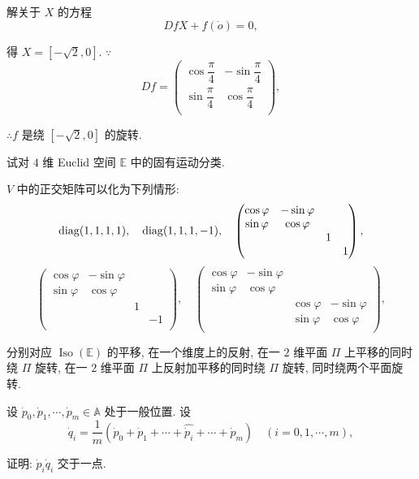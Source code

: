 \documentclass[color=black,device=normal,lang=cn,mode=geye]{elegantnote}
\begin{document}
\begin{solution}
    解关于 $X$ 的方程
    \[DfX+f(\dot{o})=0,\]

    得 $X=[-\sqrt{2},0]$. $\because$
    \[Df=\begin{pmatrix}
        \cos\dfrac{\pi}{4} & -\sin\dfrac{\pi}{4} \\[8pt]
        \sin\dfrac{\pi}{4} & \cos\dfrac{\pi}{4} \\
    \end{pmatrix},\]

    $\therefore f$ 是绕 $[-\sqrt{2},0]$ 的旋转.
\end{solution}
\begin{exercise}%
    试对 $4$ 维 Euclid 空间 $\mathbb{E}$ 中的固有运动分类.
\end{exercise}
\begin{solution}
    $V$ 中的正交矩阵可以化为下列情形:
    \[\operatorname{diag} (1,1,1,1),\quad\operatorname{diag} (1,1,1,-1),\quad\begin{pmatrix}
        \cos\varphi & -\sin\varphi \\
        \sin\varphi & \cos\varphi \\
        && 1 \\
        &&& 1 \\
    \end{pmatrix},\]
    \[\begin{pmatrix}
        \cos\varphi & -\sin\varphi \\
        \sin\varphi & \cos\varphi \\
        && 1 \\
        &&& -1 \\
    \end{pmatrix},\quad\begin{pmatrix}
        \cos\varphi & -\sin\varphi \\
        \sin\varphi & \cos\varphi \\
        && \cos\varphi & -\sin\varphi \\
        && \sin\varphi & \cos\varphi \\
    \end{pmatrix},\]

    分别对应 $\operatorname{Iso}(\mathbb{E})$ 的平移, 在一个维度上的反射, 在一 $2$ 维平面 $\varPi$ 上平移的同时绕 $\varPi$ 旋转, 在一 $2$ 维平面 $\varPi$ 上反射加平移的同时绕 $\varPi$ 旋转, 同时绕两个平面旋转.
\end{solution}
\begin{exercisec}%
    设 $\dot{p}_0,\dot{p}_1,\cdots,\dot{p}_m\in\mathbb{A}$ 处于一般位置. 设
    \[\dot{q}_i=\dfrac{1}{m}(\dot{p}_0+\dot{p}_1+\cdots+\widehat{\dot{p}_i}+\cdots+\dot{p}_m)\quad (i=0,1,\cdots,m),\]

    证明: $\dot{p}_i\dot{q}_i$ 交于一点.
\end{exercisec}
\end{document}
